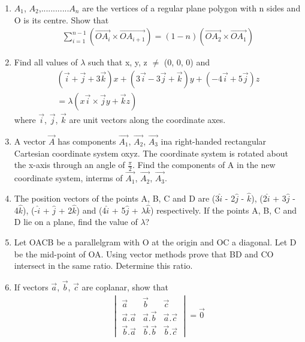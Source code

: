 \begin{enumerate}[label=\arabic*.,ref=\thesubsection.\theenumi]
\item $A_1$, $A_2$,............$A_n$ are the vertices of a regular plane polygon with n sides and O is its centre. Show that 
\begin{align*}
\sum_{i=1}^{n-1} (\overrightarrow{OA_{i}} \times \overrightarrow{OA_{i+1}}) = (1-n)(\overrightarrow{OA_{2}} \times \overrightarrow{OA_{1}})
\end{align*}

\item Find all values of $\lambda$ such that x, y, z $\neq$ (0, 0, 0) and 
\begin{align*}
(\overrightarrow{i} + \overrightarrow{j} + 3\overrightarrow{k})x + (3\overrightarrow{i} - 3\overrightarrow{j} + \overrightarrow{k})y + (-4\overrightarrow{i} + 5\overrightarrow{j})z\\
 = \lambda(x\overrightarrow{i} \times \overrightarrow{j}y + \overrightarrow{k}z)
\end{align*}
where $\overrightarrow{i}$, $\overrightarrow{j}$, $\overrightarrow{k}$ are unit vectors along the coordinate axes.

\item A vector $\overrightarrow{A}$ has components $\overrightarrow{A_1}$, $\overrightarrow{A_2}$, $\overrightarrow{A_3}$ ina right-handed rectangular Cartesian coordinate system oxyz. The coordinate system is rotated about the x-axis through an angle of $\frac{\pi}{2}$. Find the components of A in the new coordinate system, interms of $\overrightarrow{A_1}$, 
$\overrightarrow{A_2}$, $\overrightarrow{A_3}$.

\item The position vectors of the points A, B, C and D are (3$\hat{i}$ - 2$\hat{j}$ - $\hat{k}$), (2$\hat{i}$ + 3$\hat{j}$ - 4$\hat{k}$), (-$\hat{i}$ + $\hat{j}$ + 2$\hat{k}$) and (4$\hat{i}$ + 5$\hat{j}$ + $\lambda\hat{k}$) respectively. If the points A, B, C and D lie on a plane, find the value of $\lambda$?

\item Let OACB be a parallelgram with O at the origin and OC a diagonal. Let D be the mid-point of OA. Using vector methods prove that BD and CO intersect in the same ratio. Determine this ratio.

\item If vectors $\overrightarrow{a}$, $\overrightarrow{b}$, $\overrightarrow{c}$ are coplanar, show that
\begin{align*}
\begin{vmatrix}
\overrightarrow{a} & \overrightarrow{b} & \overrightarrow{c} \\ 
\overrightarrow{a} . \overrightarrow{a} & \overrightarrow{a} . \overrightarrow{b} & \overrightarrow{a} . \overrightarrow{c} \\ 
\overrightarrow{b} . \overrightarrow{a} & \overrightarrow{b} . \overrightarrow{b} & \overrightarrow{b} . \overrightarrow{c}
\end{vmatrix} = \overrightarrow{0}
\end{align*}


\end{enumerate}
